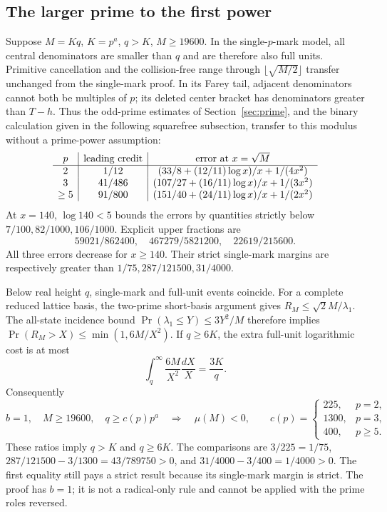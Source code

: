 \documentclass[11pt]{article}
\theoremstyle{definition}\newtheorem{definition}[theorem]{Definition}
\theoremstyle{remark}\newtheorem{remark}[theorem]{Remark}
\begin{document}
\subsection{The larger prime to the first power}
\label{ap:finite:ratio}

Suppose \(M=Kq\), \(K=p^a\), \(q>K\), \(M\ge19600\).
In the single-\(p\)-mark model, all central denominators are smaller
than \(q\) and are therefore also full units.  Primitive cancellation
and the collision-free range through \(\lfloor\sqrt{M/2}\rfloor\)
transfer unchanged from the single-mark proof.  In its Farey tail,
adjacent denominators cannot both be multiples of \(p\); its deleted
center bracket has denominators greater than \(T-h\).
Thus the odd-prime estimates of Section~\ref{sec:prime}, and the binary
calculation given in the following squarefree subsection, transfer to
this modulus without a prime-power assumption:
\[
\begin{array}{c|c|c}
p&\hbox{leading credit}&\hbox{error at }x=\sqrt M\\ \hline
2&1/12&(33/8+(12/11)\log x)/x+1/(4x^2)\\
3&41/486&(107/27+(16/11)\log x)/x+1/(3x^2)\\
\ge5&91/800&(151/40+(24/11)\log x)/x+1/(2x^2)
\end{array}
\]
At \(x=140\), \(\log140<5\) bounds the errors by quantities strictly
below \(7/100,82/1000,106/1000\).  Explicit upper fractions are
\[
 59021/862400,\quad467279/5821200,\quad22619/215600 .
\]
All three errors decrease for \(x\ge140\).  Their strict single-mark
margins are respectively greater than \(1/75,287/121500,31/4000\).

Below real height \(q\), single-mark and full-unit events coincide.
For a complete reduced lattice basis, the two-prime short-basis argument
gives \(R_M\le\sqrt2M/\lambda_1\).  The all-state incidence bound
\(\Pr(\lambda_1\le Y)\le3Y^2/M\) therefore implies
\(\Pr(R_M>X)\le\min(1,6M/X^2)\).
If \(q\ge6K\), the extra full-unit logarithmic cost is at most
\[
 \int_q^\infty\frac{6M}{X^2}\frac{dX}{X}=\frac{3K}{q}.
\]
Consequently
\begin{equation}
 b=1,\quad M\ge19600,\quad q\ge c(p)p^a
 \quad\Longrightarrow\quad\mu(M)<0,\qquad
 c(p)=\begin{cases}225,&p=2,\\1300,&p=3,\\400,&p\ge5.\end{cases}
 \label{eq:finite:ratio}
\end{equation}
These ratios imply \(q>K\) and \(q\ge6K\).
The comparisons are \(3/225=1/75\),
\(287/121500-3/1300=43/789750>0\), and
\(31/4000-3/400=1/4000>0\).
The first equality still pays a strict result because its single-mark
margin is strict.  The proof has \(b=1\); it is not a radical-only rule
and cannot be applied with the prime roles reversed.
\end{document}
